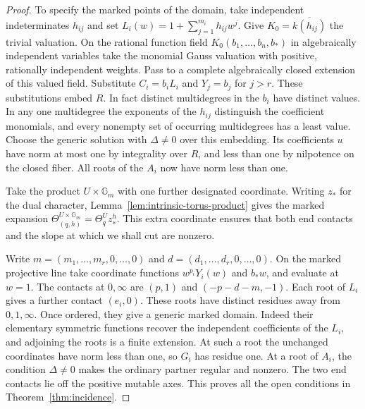 \documentclass[11pt,reqno]{amsart}
\numberwithin{equation}{section}
\theoremstyle{definition}
\theoremstyle{remark}
\begin{document}
\begin{proof}
To specify the marked points of the domain, take independent
indeterminates \(h_{ij}\) and set \(L_i(w)=1+\sum_{j=1}^{m_i}h_{ij}w^j\).
Give \(K_0=\overline{k(h_{ij})}\) the trivial valuation. On the
rational function field \(K_0(b_1,\ldots,b_n,b_*)\) in algebraically
independent variables take the monomial Gauss valuation with positive,
rationally independent weights. Pass to a complete algebraically
closed extension of this valued field. Substitute \(C_i=b_iL_i\) and \(Y_j=b_j\) for \(j>r\).
These substitutions embed \(R\). In fact distinct multidegrees in
the \(b_i\) have distinct values. In any one multidegree the
exponents of the \(h_{ij}\) distinguish the coefficient monomials,
and every nonempty set of occurring multidegrees has a least value.
Choose the generic solution with \(\Delta\ne0\) over this embedding.
Its coefficients \(u\) have norm at most one by integrality over \(R\),
and less than one by nilpotence on the closed fiber. All roots of the
\(A_i\) now have norm less than one.

Take the product \(U\times\mathbb G_m\) with one further designated
coordinate. Writing \(z_*\) for the dual character,
Lemma~\ref{lem:intrinsic-torus-product} gives the marked expansion
\(\Theta^{U\times\mathbb G_m}_{(q,h)}=\Theta^U_q z_*^h\).
This extra coordinate ensures that both end contacts and the slope
at which we shall cut are nonzero.

Write \(m=(m_1,\ldots,m_r,0,\ldots,0)\) and
\(d=(d_1,\ldots,d_r,0,\ldots,0)\). On the marked projective line take coordinate functions
\(w^{p_i}Y_i(w)\) and \(b_*w\), and evaluate at \(w=1\).
The contacts at \(0,\infty\) are \((p,1)\) and
\((-p-d-m,-1)\). Each root of \(L_i\) gives a further contact
\((e_i,0)\). These roots have distinct residues away from \(0,1,\infty\).
Once ordered, they give a generic marked domain. Indeed their
elementary symmetric functions recover the independent coefficients
of the \(L_i\), and adjoining the roots is a finite extension.
At such a root the unchanged coordinates have norm less than one,
so \(G_i\) has residue one. At a root of \(A_i\), the condition
\(\Delta\ne0\) makes the ordinary partner regular and nonzero.
The two end contacts lie off the positive mutable axes. This proves
all the open conditions in Theorem~\ref{thm:incidence}.


\end{proof}
\end{document}
